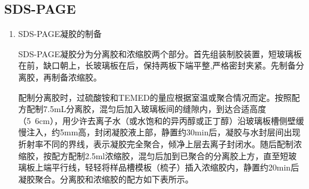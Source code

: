 \subsection{SDS-PAGE}
\begin{enumerate}
    \item SDS-PAGE凝胶的制备

\hspace*{2em} SDS-PAGE凝胶分为分离胶和浓缩胶两个部分。首先组装制胶装置，短玻璃板在前，缺口朝上，长玻璃板在后，保持两板下端平整,严格密封夹紧。先制备分离胶，再制备浓缩胶。

\hspace*{2em} 配制分离胶时，过硫酸铵和TEMED的量应根据室温或聚合情况而定。按照配方配制7.5mL分离胶，混匀后加入玻璃板间的缝隙内，到达合适高度（5~6cm），用少许去离子水（或水饱和的异丙醇或正丁醇）沿玻璃板槽侧壁缓慢注入，约5mm高，封闭凝胶液上部，静置约30min后，凝胶与水封层间出现折射率不同的界线，表示凝胶完全聚合，倾净上层去离子封闭水。随后配制浓缩胶，按配方配制2.5ml浓缩胶，混匀后加到已聚合的分离胶上方，直至短玻璃板上端平行线，轻轻将样品槽模板（梳子）插入浓缩胶内，静置约20min后凝胶聚合。分离胶和浓缩胶的配方如下表所示。


\end{enumerate}

